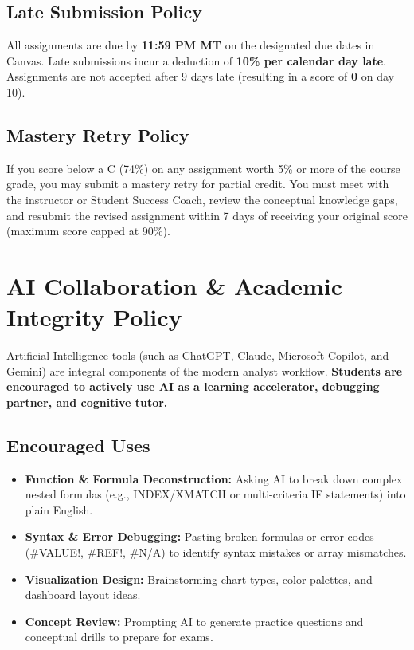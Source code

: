 \documentclass[11pt,a4paper]{article}
\begin{document}
\subsection*{Late Submission Policy}
All assignments are due by \textbf{11:59 PM MT} on the designated due dates in Canvas. Late submissions incur a deduction of \textbf{10\% per calendar day late}. Assignments are not accepted after 9 days late (resulting in a score of \textbf{0} on day 10).

\subsection*{Mastery Retry Policy}
If you score below a C (74\%) on any assignment worth 5\% or more of the course grade, you may submit a mastery retry for partial credit. You must meet with the instructor or Student Success Coach, review the conceptual knowledge gaps, and resubmit the revised assignment within 7 days of receiving your original score (maximum score capped at 90\%).

\section*{AI Collaboration \& Academic Integrity Policy}
Artificial Intelligence tools (such as ChatGPT, Claude, Microsoft Copilot, and Gemini) are integral components of the modern analyst workflow. \textbf{Students are encouraged to actively use AI as a learning accelerator, debugging partner, and cognitive tutor.}

\subsection*{Encouraged Uses}
\begin{itemize}[leftmargin=*]
    \item \textbf{Function \& Formula Deconstruction:} Asking AI to break down complex nested formulas (e.g., INDEX/XMATCH or multi-criteria IF statements) into plain English.
    \item \textbf{Syntax \& Error Debugging:} Pasting broken formulas or error codes (\#VALUE!, \#REF!, \#N/A) to identify syntax mistakes or array mismatches.
    \item \textbf{Visualization Design:} Brainstorming chart types, color palettes, and dashboard layout ideas.
    \item \textbf{Concept Review:} Prompting AI to generate practice questions and conceptual drills to prepare for exams.
\end{itemize}
\end{document}
